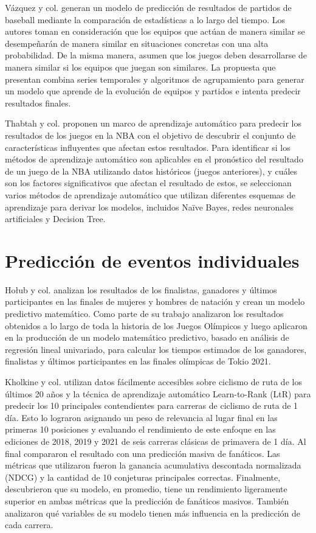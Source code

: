 Vázquez y col. \cite{vazquez2014combining} generan un modelo de predicción de resultados de partidos de baseball mediante la comparación de estadísticas a lo largo del tiempo. Los autores toman en consideración que los equipos que actúan de manera similar se desempeñarán de manera similar en situaciones concretas con una alta probabilidad. De la misma manera, asumen que los juegos deben desarrollarse de manera similar si los equipos que juegan son similares. La propuesta que presentan combina series temporales y algoritmos de agrupamiento para generar un modelo que aprende de la evolución de equipos y partidos e intenta predecir resultados finales.

Thabtah y col. \cite{thabtah2019nba} proponen un marco de aprendizaje automático para predecir los resultados de los juegos en la NBA con el objetivo de descubrir el conjunto de características influyentes que afectan estos resultados. Para identificar si los métodos de aprendizaje automático son aplicables en el pronóstico del resultado de un juego de la NBA utilizando datos históricos (juegos anteriores), y cuáles son los factores significativos que afectan el resultado de estos, se seleccionan varios métodos de aprendizaje automático que utilizan diferentes esquemas de aprendizaje para derivar los modelos, incluidos Naïve Bayes, redes neuronales artificiales y Decision Tree. 

\section{Predicción de eventos individuales}

Ho{\l}ub y col. \cite{holub2021predicting} analizan los resultados de los finalistas, ganadores y últimos participantes en las finales de mujeres y hombres de natación y crean un modelo predictivo matemático. Como parte de su trabajo analizaron los resultados obtenidos a lo largo de toda la historia de los Juegos Olímpicos y luego aplicaron en la producción de un modelo matemático predictivo, basado en análisis de regresión lineal univariado, para calcular los tiempos estimados de los ganadores, finalistas y últimos participantes en las finales olímpicas de Tokio 2021.

Kholkine y col. \cite{kholkine2021learn} utilizan datos fácilmente accesibles sobre ciclismo de ruta de los últimos 20 años y la técnica de aprendizaje automático Learn-to-Rank (LtR) para predecir los 10 principales contendientes para carreras de ciclismo de ruta de 1 día. Esto lo lograron asignando un peso de relevancia al lugar final en las primeras 10 posiciones y evaluando el rendimiento de este enfoque en las ediciones de 2018, 2019 y 2021 de seis carreras clásicas de primavera de 1 día. Al final compararon el resultado con una predicción masiva de fanáticos. Las métricas que utilizaron fueron la ganancia acumulativa descontada normalizada (NDCG) y la cantidad de 10 conjeturas principales correctas. Finalmente, descubrieron que su modelo, en promedio, tiene un rendimiento ligeramente superior en ambas métricas que la predicción de fanáticos masivos. También analizaron qué variables de su modelo tienen más influencia en la predicción de cada carrera.

